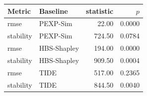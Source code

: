 \begin{tabular}{llrr}
\toprule
Metric & Baseline & statistic & $p$\\
\midrule
rmse & PEXP-Sim & 22.00 & 0.0000\\
stability & PEXP-Sim & 724.50 & 0.0784\\
rmse & HBS-Shapley & 194.00 & 0.0000\\
stability & HBS-Shapley & 909.50 & 0.0004\\
rmse & TIDE & 517.00 & 0.2365\\
stability & TIDE & 844.50 & 0.0040\\
\bottomrule
\end{tabular}
